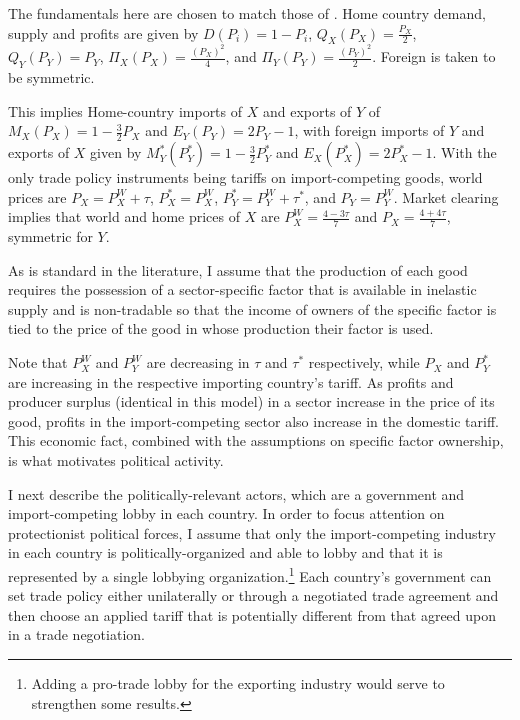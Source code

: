 \documentclass[12pt]{article}
\begin{document}
The fundamentals here are chosen to match those of \Textcite{bs2001,bs2005}. Home country demand, supply and profits are given by $D(P_i) = 1 - P_i$, $Q_X(P_X) = \frac{P_X}{2}$, $Q_Y(P_Y) = P_Y$, $\Pi_X(P_X) = \frac{(P_X)^2}{4}$, and $\Pi_Y(P_Y) = \frac{(P_Y)^2}{2}$. %
Foreign is taken to be symmetric.

This implies Home-country imports of $X$ and exports of $Y$ of $M_X(P_X)= 1 - \frac{3}{2}P_X$ and $E_Y(P_Y)= 2P_Y -1$, with foreign imports of $Y$ and exports of $X$ given by $M_Y^*(P_Y^*)= 1 - \frac{3}{2}P_Y^*$ and $E_X(P_X^*)= 2P_X^* -1$. With the only trade policy instruments being tariffs on import-competing goods, world prices are $P_X = P_X^W + \tau$, $P_X^* = P_X^W$, $P_Y^* = P_Y^W + \tau^*$, and $P_Y = P_Y^W$. Market clearing implies that world and home prices of $X$ are $P_X^W = \frac{4-3\tau}{7}$ and $P_X = \frac{4+4\tau}{7}$, symmetric for $Y$.

As is standard in the literature, I assume that the production of each good requires the possession of a sector-specific factor that is available in inelastic supply and is non-tradable so that the income of owners of the specific factor is tied to the price of the good in whose production their factor is used. 

Note that $P_X^W$ and $P_Y^W$ are decreasing in $\tau$ and $\tau^*$ respectively, while $P_X$ and $P_Y^*$ are increasing in the respective importing country's tariff. As profits and producer surplus (identical in this model) in a sector increase in the price of its good, profits in the import-competing sector also increase in the domestic tariff. This economic fact, combined with the assumptions on specific factor ownership, is what motivates political activity.

I next describe the politically-relevant actors, which are a government and import-competing lobby in each country. In order to focus attention on protectionist political forces, I assume that only the import-competing industry in each country is politically-organized and able to lobby and that it is represented by a single lobbying organization.\footnote{Adding a pro-trade lobby for the exporting industry would serve to strengthen some results.} Each country's government can set trade policy either unilaterally or through a negotiated trade agreement and then choose an applied tariff that is potentially different from that agreed upon in a trade negotiation.
\end{document}
